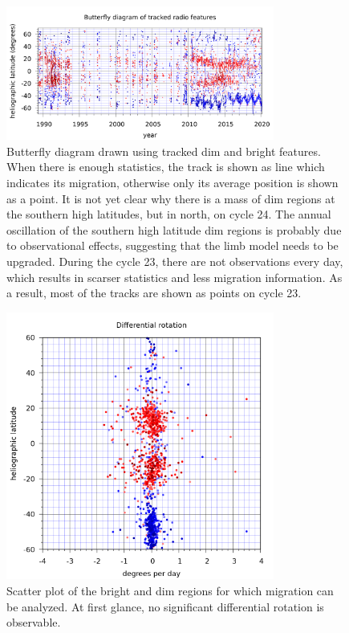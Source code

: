 \documentclass{aa}
\begin{document}
\begin{figure} \centering \includegraphics[width=8.8cm]{track_butterfly.png}
\caption{Butterfly diagram drawn using tracked dim and bright features. When there is enough statistics, the track is shown as line which indicates its migration, otherwise only its average position is shown as a point. It is not yet clear why there is a mass of dim regions at the southern high latitudes, but in north, on cycle 24. The annual oscillation of the southern high latitude dim regions is probably due to observational effects, suggesting that the limb model needs to be upgraded. During the cycle 23, there are not observations every day, which results in scarser statistics and less migration information. As a result, most of the tracks are shown as points on cycle 23.}
\label{track_butterfly} \end{figure}

\begin{figure} \centering \includegraphics[width=8.8cm]{diffrot.png}
\caption{Scatter plot of the bright and dim regions for which migration can be analyzed. At first glance, no significant differential rotation is observable.}
\label{diffrot} \end{figure}
\end{document}
